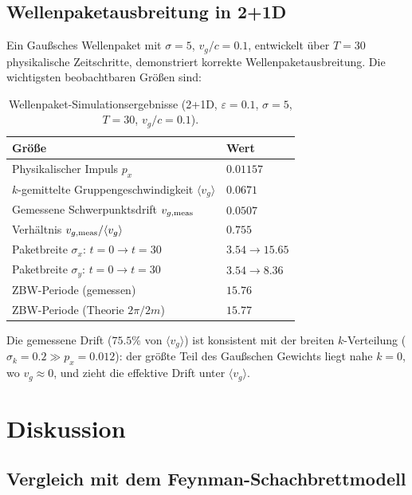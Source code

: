 \documentclass[twocolumn,showpacs,preprintnumbers,amsmath,amssymb]{revtex4-2}
\newcommand{\eps}{\varepsilon}
\newcommand{\avg}[1]{\langle #1 \rangle}
\begin{document}
\subsection{Wellenpaketausbreitung in 2+1D}

Ein Gaußsches Wellenpaket mit $\sigma = 5$, $v_g/c = 0.1$, entwickelt über
$T = 30$ physikalische Zeitschritte, demonstriert korrekte
Wellenpaketausbreitung.
Die wichtigsten beobachtbaren Größen sind:

\begin{table}[h]
\caption{Wellenpaket-Simulationsergebnisse (2+1D, $\eps=0.1$, $\sigma=5$,
$T=30$, $v_g/c=0.1$).}
\label{tab:wavepacket}
\begin{ruledtabular}
\begin{tabular}{ll}
Größe & Wert \\
\hline
Physikalischer Impuls $p_x$ & $0.01157$ \\
$k$-gemittelte Gruppengeschwindigkeit $\avg{v_g}$ & $0.0671$ \\
Gemessene Schwerpunktsdrift $v_{g,\rm meas}$ & $0.0507$ \\
Verhältnis $v_{g,\rm meas}/\avg{v_g}$ & $0.755$ \\
Paketbreite $\sigma_x$: $t{=}0 \to t{=}30$ & $3.54 \to 15.65$ \\
Paketbreite $\sigma_y$: $t{=}0 \to t{=}30$ & $3.54 \to 8.36$ \\
ZBW-Periode (gemessen) & $15.76$ \\
ZBW-Periode (Theorie $2\pi/2m$) & $15.77$ \\
\end{tabular}
\end{ruledtabular}
\end{table}

Die gemessene Drift ($75.5\%$ von $\avg{v_g}$) ist konsistent mit der breiten
$k$-Verteilung ($\sigma_k = 0.2 \gg p_x = 0.012$): der größte Teil des
Gaußschen Gewichts liegt nahe $k = 0$, wo $v_g \approx 0$, und zieht
die effektive Drift unter $\avg{v_g}$.


\section{Diskussion}
\label{sec:discussion}

\subsection{Vergleich mit dem Feynman-Schachbrettmodell}
\end{document}
